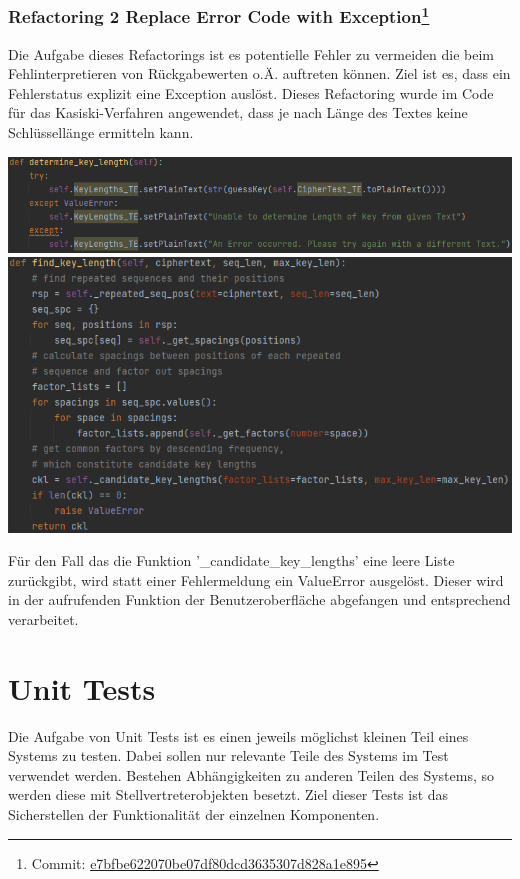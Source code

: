 \documentclass[12pt]{article}
\begin{document}
\subsubsection[Refactoring 2 Replace Error Code with Exception]{Refactoring 2 Replace Error Code with Exception\protect\footnote{Commit: \href{https://github.com/NicoSchrodt/EncryptionService/commit/e7bfbe622070be07df80dcd3635307d828a1e895}{e7bfbe622070be07df80dcd3635307d828a1e895}}}
Die Aufgabe dieses Refactorings ist es potentielle Fehler zu vermeiden die beim Fehlinterpretieren von Rückgabewerten o.Ä. auftreten können. Ziel ist es, dass ein Fehlerstatus explizit eine Exception auslöst. Dieses Refactoring wurde im Code für das Kasiski-Verfahren angewendet, dass je nach Länge des Textes keine Schlüssellänge ermitteln kann.
\begin{center}
	\includegraphics[width=15cm]{bilder/Refactoring2_b.png}
	\includegraphics[width=15cm]{bilder/Refactoring2_a.png}
\end{center}
Für den Fall das die Funktion '\_candidate\_key\_lengths' eine leere Liste zurückgibt, wird statt einer Fehlermeldung ein ValueError ausgelöst. Dieser wird in der aufrufenden Funktion der Benutzeroberfläche abgefangen und entsprechend verarbeitet.
\newpage

\section{Unit Tests}
Die Aufgabe von Unit Tests ist es einen jeweils möglichst kleinen Teil eines Systems zu testen. Dabei sollen nur relevante Teile des Systems im Test verwendet werden. Bestehen Abhängigkeiten zu anderen Teilen des Systems, so werden diese mit Stellvertreterobjekten besetzt. Ziel dieser Tests ist das Sicherstellen der Funktionalität der einzelnen Komponenten.
\end{document}
